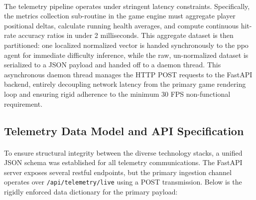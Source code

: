 \paragraph{} The telemetry pipeline operates under stringent latency constraints. Specifically, the metrics collection sub-routine in the game engine must aggregate player positional deltas, calculate running health averages, and compute continuous hit-rate accuracy ratios in under 2 milliseconds. This aggregate dataset is then partitioned: one localized normalized vector is handed synchronously to the \ac{ppo} agent for immediate difficulty inference, while the raw, un-normalized dataset is serialized to a JSON payload and handed off to a daemon thread. This asynchronous daemon thread manages the HTTP POST requests to the FastAPI backend, entirely decoupling network latency from the primary game rendering loop and ensuring rigid adherence to the minimum 30 FPS non-functional requirement.

\subsection{Telemetry Data Model and API Specification}
\paragraph{} To ensure structural integrity between the diverse technology stacks, a unified JSON schema was established for all telemetry communications. The FastAPI server exposes several \ac{rest}ful endpoints, but the primary ingestion channel operates over \texttt{/api/telemetry/live} using a POST transmission. Below is the rigidly enforced data dictionary for the primary payload:

